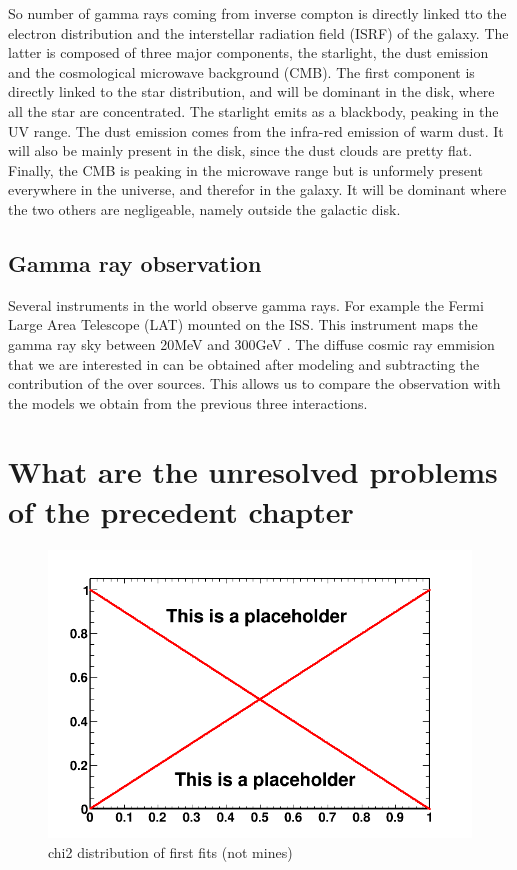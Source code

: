 So number of gamma rays coming from inverse compton is directly linked tto the electron distribution and the interstellar radiation field (ISRF) of the galaxy. The latter is composed of three major components, the starlight, the dust emission and the cosmological microwave background (CMB). The first component is directly linked to the star distribution, and will be dominant in the disk, where all the star are concentrated. The starlight emits as a blackbody, peaking in the UV range. The dust emission comes from the infra-red emission of warm dust. It will also be mainly present in the disk, since the dust clouds are pretty flat. Finally, the CMB is peaking in the microwave range but is unformely present everywhere in the universe, and therefor in the galaxy. It will be dominant where the two others are negligeable, namely outside the galactic disk.



\subsection{Gamma ray observation}

Several instruments in the world observe gamma rays. For example the Fermi Large Area Telescope (LAT) mounted on the ISS. This instrument maps the gamma ray sky between 20MeV and 300GeV . The diffuse cosmic ray emmision that we are interested in can be obtained after modeling and subtracting the contribution of the over sources. This allows us to compare the observation with the models we obtain from the previous three interactions.



\section{What are the unresolved problems of the precedent chapter}
%	

\begin{figure}
 \centering
 \includegraphics[width=.9\linewidth]{pic/dummy.png}
 \caption{chi2 distribution of first fits (not mines)}
 \label{fig:first_BKGonly_fits}
\end{figure}

